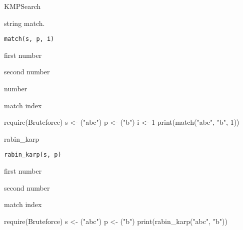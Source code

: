 \documentclass[a4paper]{book}
\begin{document}
%
\begin{Value}
KMPSearch
\end{Value}
%
\begin{Description}
string match.
\end{Description}
%
\begin{Usage}
\begin{verbatim}
match(s, p, i)
\end{verbatim}
\end{Usage}
%
\begin{Arguments}
\begin{ldescription}
\item[\code{s}] first number

\item[\code{p}] second number

\item[\code{i}] number
\end{ldescription}
\end{Arguments}
%
\begin{Value}
match index
\end{Value}
%
\begin{Examples}
\begin{ExampleCode}
require(Bruteforce)
s <- ("abc")
p <- ("b")
i <- 1
print(match("abc", "b", 1))

\end{ExampleCode}
\end{Examples}
%
\begin{Description}
rabin\_karp
\end{Description}
%
\begin{Usage}
\begin{verbatim}
rabin_karp(s, p)
\end{verbatim}
\end{Usage}
%
\begin{Arguments}
\begin{ldescription}
\item[\code{s}] first number

\item[\code{p}] second number
\end{ldescription}
\end{Arguments}
%
\begin{Value}
match index
\end{Value}
%
\begin{Examples}
\begin{ExampleCode}
require(Bruteforce)
s <- ("abc")
p <- ("b")
print(rabin_karp("abc", "b"))

\end{ExampleCode}
\end{Examples}
\printindex{}
\end{document}
